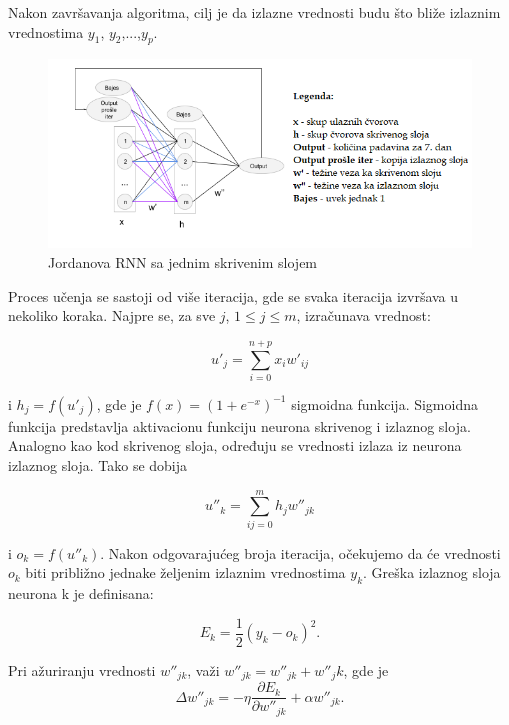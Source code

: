 \documentclass[a4paper]{article}
\begin{document}
Nakon završavanja algoritma, cilj je da izlazne vrednosti budu što bliže izlaznim vrednostima $y_1$, $y_2$,...,$y_p$.

\begin{figure}[h!]
\begin{center}
\includegraphics[scale=0.7]{net.png}
\end{center}
\caption{Jordanova RNN sa jednim skrivenim slojem}
\end{figure}

Proces učenja se sastoji od više iteracija, gde se svaka iteracija izvršava u nekoliko koraka. Najpre se, za sve $j$, $1\leq{}j\leq{}m$, izračunava vrednost:

\begin{equation}
u'_j = \sum_{i=0}^{n+p}x_iw'_{ij}
\end{equation}
 
i $h_j= f(u'_j)$, gde je $f(x)=(1+e^{-x})^{-1}$ sigmoidna funkcija. Sigmoidna funkcija predstavlja aktivacionu funkciju neurona skrivenog i izlaznog sloja. Analogno kao kod skrivenog sloja, određuju se vrednosti izlaza iz neurona izlaznog sloja. Tako se dobija 

\begin{equation}
u{''}_k = \sum_{ij=0}^{m}h_jw{''}_{jk}
\end{equation}
 
i $o_k= f(u{''}_k)$. Nakon odgovarajućeg broja iteracija, očekujemo da će vrednosti $o_k$ biti približno jednake željenim izlaznim vrednostima $y_k$.
Greška izlaznog sloja neurona k je definisana:

\begin{equation}
E_k = \frac{1}{2}(y_k - o_k)^2.
\end{equation}

Pri ažuriranju vrednosti $w{''}_{jk}$, važi $w{''}_{jk}=w{''}_{jk}+w{''}_jk$, gde je
$$\Delta{} w{''}_{jk}=- \eta{}\frac{\partial{}E_k}{\partial{}w{''}_{jk}}+\alpha{}w{''}_{jk}.$$
\end{document}
